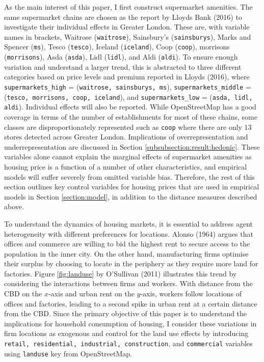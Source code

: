 \documentclass{article}
\begin{document}
As the main interest of this paper, I first construct supermarket amenities. The same supermarket chains are chosen as the report by Lloyds Bank (2016) to investigate their individual effects in Greater London. These are, with variable names in brackets, Waitrose (\texttt{waitrose}), Sainsbury's (\texttt{sainsburys}), Marks and Spencer (\texttt{ms}), Tesco (\texttt{tesco}), Iceland (\texttt{iceland}), Coop (\texttt{coop}), morrisons (\texttt{morrisons}), Asda (\texttt{asda}), Lidl (\texttt{lidl}), and Aldi (\texttt{aldi}). To ensure enough variation and understand a larger trend, this is abstracted to three different categories based on price levels and premium reported in Lloyds (2016), where \texttt{supermarkets\_high} = (\texttt{waitrose, sainsburys, ms}), \texttt{supermarkets\_middle} = (\texttt{tesco, morrisons, coop, iceland}), and \texttt{supermarkets\_low} = (\texttt{asda, lidl, aldi}). Individual effects will also be reported. While OpenStreetMap has a good coverage in terms of the number of establishments for most of these chains, some classes are disproportionately represented such as \texttt{coop} where there are only 13 stores detected across Greater London. Implications of overrepresentation and underrepresentation are discussed in Section \ref{subsubsection:result:hedonic}. These variables alone cannot explain the marginal effects of supermarket amenities as housing price is a function of a number of other characteristics, and empirical models will suffer severely from omitted variable bias. Therefore, the rest of this section outlines key control variables for housing prices that are used in empirical models in Section \ref{section:model}, in addition to the distance measures described above.

To understand the dynamics of housing markets, it is essential to address agent heterogeneity with different preferences for locations. Alonso (1964) argues that offices and commerce are willing to bid the highest rent to secure access to the population in the inner city. On the other hand, manufacturing firms optimise their surplus by choosing to locate in the periphery as they require more land for factories. Figure \ref{fig:landuse} by O'Sullivan (2011) illustrates this trend by considering the interactions between firms and workers. With distance from the CBD on the $x$-axis and urban rent on the $y$-axis, workers follow locations of offices and factories, leading to a second spike in urban rent at a certain distance from the CBD. Since the primary objective of this paper is to understand the implications for household consumption of housing, I consider these variations in firm locations as exogenous and control for the land use effects by introducing \texttt{retail, residential, industrial, construction}, and \texttt{commercial} variables using \texttt{landuse} key from OpenStreetMap.
\end{document}
